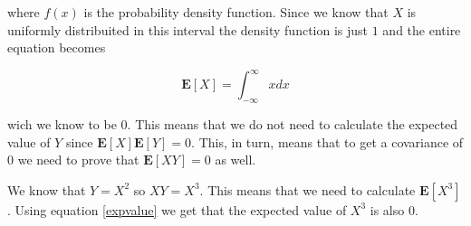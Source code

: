 \documentclass{article}
\begin{document}
where $f(x)$ is the probability density function. Since we know that $X$ is
uniformly distribuited in this interval the density function is just $1$ and
the entire equation becomes

\begin{equation}
  \mathbf{E}[X] = \int_{-\infty}^{\infty} x dx
\end{equation}

wich we know to be $0$. This means that we do not need to calculate the
expected value of $Y$ since $\mathbf{E}[X]\mathbf{E}[Y] = 0$. This, in turn,
means that to get a covariance of $0$ we need to prove that $\mathbf{E}[XY] =
0$ as well.

We know that $Y = X^2$ so $XY = X^3$. This means that we need to calculate
$\mathbf{E}[X^3]$. Using equation \ref{expvalue} we get that the expected value
of $X^3$ is also $0$.
\end{document}
